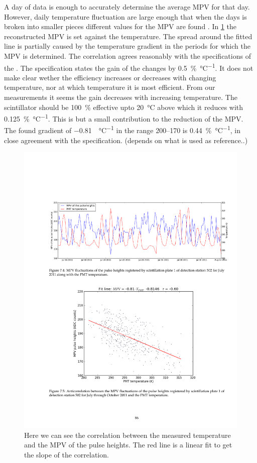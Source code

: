 A day of data is enough to accurately determine the average MPV for that day. However, daily temperature fluctuation are large enough that when the days is broken into smaller pieces different values for the MPV are found \cite{bartels2012mpv}. In \cref{fig:mpv_temperature} the reconstructed MPV is set against the \pmt temperature. The spread around the fitted line is partially caused by the temperature gradient in the periods for which the MPV is determined. The correlation agrees reasonably with the specifications of the \pmt. The specification states the gain of the \pmt changes by \SI{0.5}{\percent\per\degreeCelsius}. It does not make clear wether the efficiency increases or decreases with changing temperature, nor at which temperature it is most efficient. From our measurements it seems the gain decreases with increasing temperature. The scintillator should be \SI{100}{\percent} effective upto \SI{20}{\degreeCelsius} above which it reduces with \SI{0.125}{\percent\per\degreeCelsius}. This is but a small contribution to the reduction of the MPV. The found gradient of \SI{-0.81}{\adc\per\degreeCelsius} in the range \SIrange{200}{170}{\adc} is \SI{0.44}{\percent\per\degreeCelsius}, in close agreement with the specification. (depends on what is used as reference..)

\begin{figure}
    \centering
    \includegraphics[width=.7\linewidth]{plots/station/mpv_temperature}
    \caption{Here we can see the correlation between the measured temperature and the MPV of the pulse heights. The red line is a linear fit to get the slope of the correlation.}
    \label{fig:mpv_temperature}
\end{figure}

